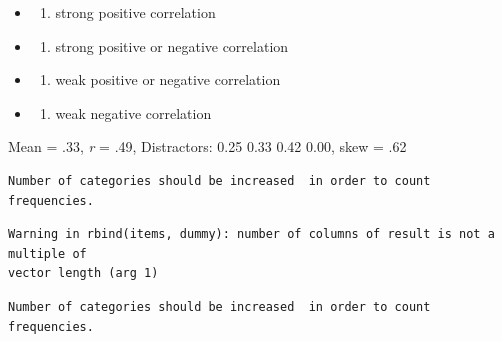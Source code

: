 \documentclass[
  english,
]{book}
\newenvironment{Shaded}{\begin{snugshade}}{\end{snugshade}}
\newcommand{\DataTypeTok}[1]{\textcolor[rgb]{0.13,0.29,0.53}{#1}}
\newcommand{\DecValTok}[1]{\textcolor[rgb]{0.00,0.00,0.81}{#1}}
\newcommand{\KeywordTok}[1]{\textcolor[rgb]{0.13,0.29,0.53}{\textbf{#1}}}
\newcommand{\NormalTok}[1]{#1}
\newcommand{\OperatorTok}[1]{\textcolor[rgb]{0.81,0.36,0.00}{\textbf{#1}}}
\providecommand{\tightlist}{%
  \setlength{\itemsep}{0pt}\setlength{\parskip}{0pt}}
\begin{document}
\begin{itemize}
\item
  \begin{enumerate}
  \def\labelenumi{\alph{enumi})}
  \tightlist
  \item
    strong positive correlation
  \end{enumerate}
\item
  \begin{enumerate}
  \def\labelenumi{\alph{enumi})}
  \setcounter{enumi}{1}
  \tightlist
  \item
    strong positive or negative correlation
  \end{enumerate}
\item
  \begin{enumerate}
  \def\labelenumi{\alph{enumi})}
  \setcounter{enumi}{2}
  \tightlist
  \item
    weak positive or negative correlation
  \end{enumerate}
\item
  \begin{enumerate}
  \def\labelenumi{\alph{enumi})}
  \setcounter{enumi}{3}
  \tightlist
  \item
    weak negative correlation
  \end{enumerate}
\end{itemize}

Mean = .33, \emph{r} = .49, Distractors: 0.25 0.33 0.42 0.00, skew = .62

\begin{Shaded}
\end{Shaded}

\begin{verbatim}
Number of categories should be increased  in order to count frequencies. 
\end{verbatim}

\begin{verbatim}
Warning in rbind(items, dummy): number of columns of result is not a multiple of
vector length (arg 1)
\end{verbatim}

\begin{verbatim}
Number of categories should be increased  in order to count frequencies. 
\end{verbatim}
\end{document}
